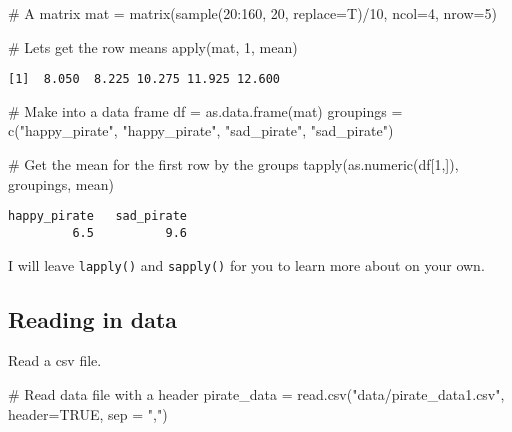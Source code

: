 \documentclass[
  letterpaper,
  DIV=11,
  numbers=noendperiod]{scrartcl}
\newenvironment{Shaded}{\begin{snugshade}}{\end{snugshade}}
\newcommand{\AttributeTok}[1]{\textcolor[rgb]{0.40,0.45,0.13}{#1}}
\newcommand{\CommentTok}[1]{\textcolor[rgb]{0.37,0.37,0.37}{#1}}
\newcommand{\ConstantTok}[1]{\textcolor[rgb]{0.56,0.35,0.01}{#1}}
\newcommand{\DecValTok}[1]{\textcolor[rgb]{0.68,0.00,0.00}{#1}}
\newcommand{\FunctionTok}[1]{\textcolor[rgb]{0.28,0.35,0.67}{#1}}
\newcommand{\NormalTok}[1]{\textcolor[rgb]{0.00,0.23,0.31}{#1}}
\newcommand{\OtherTok}[1]{\textcolor[rgb]{0.00,0.23,0.31}{#1}}
\newcommand{\SpecialCharTok}[1]{\textcolor[rgb]{0.37,0.37,0.37}{#1}}
\newcommand{\StringTok}[1]{\textcolor[rgb]{0.13,0.47,0.30}{#1}}
\begin{document}
\begin{Shaded}
\begin{Highlighting}[]
\CommentTok{\# A matrix}
\NormalTok{mat }\OtherTok{=} \FunctionTok{matrix}\NormalTok{(}\FunctionTok{sample}\NormalTok{(}\DecValTok{20}\SpecialCharTok{:}\DecValTok{160}\NormalTok{, }\DecValTok{20}\NormalTok{, }\AttributeTok{replace=}\NormalTok{T)}\SpecialCharTok{/}\DecValTok{10}\NormalTok{,}
             \AttributeTok{ncol=}\DecValTok{4}\NormalTok{,}
             \AttributeTok{nrow=}\DecValTok{5}\NormalTok{)}

\CommentTok{\# Let\textquotesingle{}s get the row means}
\FunctionTok{apply}\NormalTok{(mat, }\DecValTok{1}\NormalTok{, mean)}
\end{Highlighting}
\end{Shaded}

\begin{verbatim}
[1]  8.050  8.225 10.275 11.925 12.600
\end{verbatim}

\begin{Shaded}
\begin{Highlighting}[]
\CommentTok{\# Make into a data frame}
\NormalTok{df }\OtherTok{=} \FunctionTok{as.data.frame}\NormalTok{(mat)}
\NormalTok{groupings }\OtherTok{=} \FunctionTok{c}\NormalTok{(}\StringTok{"happy\_pirate"}\NormalTok{, }\StringTok{"happy\_pirate"}\NormalTok{, }\StringTok{"sad\_pirate"}\NormalTok{, }\StringTok{"sad\_pirate"}\NormalTok{)}

\CommentTok{\# Get the mean for the first row by the groups}
\FunctionTok{tapply}\NormalTok{(}\FunctionTok{as.numeric}\NormalTok{(df[}\DecValTok{1}\NormalTok{,]), groupings, mean)}
\end{Highlighting}
\end{Shaded}

\begin{verbatim}
happy_pirate   sad_pirate 
         6.5          9.6 
\end{verbatim}

I will leave \texttt{lapply()} and \texttt{sapply()} for you to learn
more about on your own.

\subsection{Reading in data}\label{reading-in-data}

Read a csv file.

\begin{Shaded}
\begin{Highlighting}[]
\CommentTok{\# Read data file with a header}
\NormalTok{pirate\_data }\OtherTok{=} \FunctionTok{read.csv}\NormalTok{(}\StringTok{"data/pirate\_data1.csv"}\NormalTok{,}
  \AttributeTok{header=}\ConstantTok{TRUE}\NormalTok{,}
  \AttributeTok{sep =} \StringTok{","}\NormalTok{)}
\end{Highlighting}
\end{Shaded}
\end{document}
